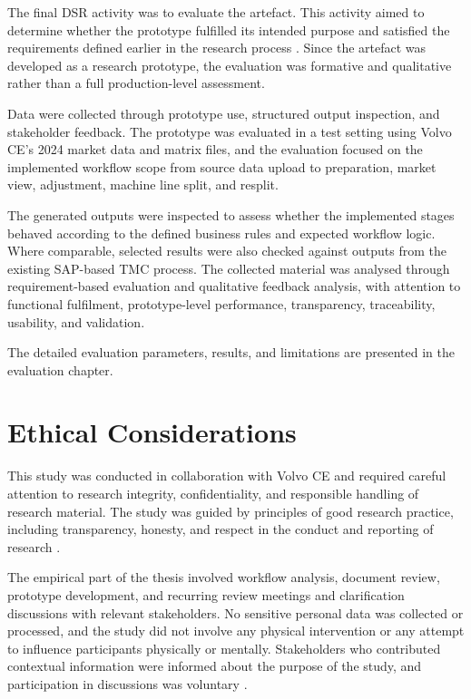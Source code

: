 The final DSR activity was to evaluate the artefact. This activity aimed to determine whether the prototype fulfilled its intended purpose and satisfied the requirements defined earlier in the research process \cite{johannesson2021,hevner2004design}. Since the artefact was developed as a research prototype, the evaluation was formative and qualitative rather than a full production-level assessment.

Data were collected through prototype use, structured output inspection, and stakeholder feedback. The prototype was evaluated in a test setting using Volvo CE's 2024 market data and matrix files, and the evaluation focused on the implemented workflow scope from source data upload to preparation, market view, adjustment, machine line split, and resplit.

The generated outputs were inspected to assess whether the implemented stages behaved according to the defined business rules and expected workflow logic. Where comparable, selected results were also checked against outputs from the existing SAP-based TMC process. The collected material was analysed through requirement-based evaluation and qualitative feedback analysis, with attention to functional fulfilment, prototype-level performance, transparency, traceability, usability, and validation.

The detailed evaluation parameters, results, and limitations are presented in the evaluation chapter.











\section{Ethical Considerations}

This study was conducted in collaboration with Volvo CE and required careful attention to research integrity, confidentiality, and responsible handling of research material. The study was guided by principles of good research practice, including transparency, honesty, and respect in the conduct and reporting of research \cite{su_ethics_policy}.

The empirical part of the thesis involved workflow analysis, document review, prototype development, and recurring review meetings and clarification discussions with relevant stakeholders. No sensitive personal data was collected or processed, and the study did not involve any physical intervention or any attempt to influence participants physically or mentally. Stakeholders who contributed contextual information were informed about the purpose of the study, and participation in discussions was voluntary \cite{etikprovningsmyndigheten_act}.

